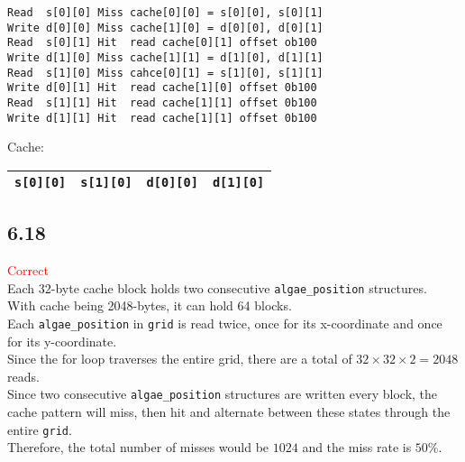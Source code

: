 \begin{verbatim}
Read  s[0][0] Miss cache[0][0] = s[0][0], s[0][1]
Write d[0][0] Miss cache[1][0] = d[0][0], d[0][1]
Read  s[0][1] Hit  read cache[0][1] offset ob100
Write d[1][0] Miss cache[1][1] = d[1][0], d[1][1]
Read  s[1][0] Miss cahce[0][1] = s[1][0], s[1][1]
Write d[0][1] Hit  read cache[1][0] offset 0b100
Read  s[1][1] Hit  read cache[1][1] offset 0b100
Write d[1][1] Hit  read cache[1][1] offset 0b100
\end{verbatim}

\noindent
Cache:
\begin{tabular}{|l|l|l|l|}
\hline
\verb+s[0][0]+ & \verb+s[1][0]+ & \verb+d[0][0]+ & \verb+d[1][0]+ \\ \hline
\end{tabular}

\subsection*{6.18}
\textcolor{red}{Correct}\\
Each 32-byte cache block holds two consecutive \verb+algae_position+ structures.\\
With cache being 2048-bytes, it can hold 64 blocks.\\
Each \verb+algae_position+ in \verb+grid+ is read twice, once for its x-coordinate and once for its y-coordinate.\\
Since the for loop traverses the entire grid, there are a total of $32\times32\times2=2048$ reads.\\
Since two consecutive \verb+algae_position+ structures are written every block, the cache pattern will miss, then hit and alternate between these states through the entire \verb+grid+.\\
Therefore, the total number of misses would be $1024$ and the miss rate is $50\%$.